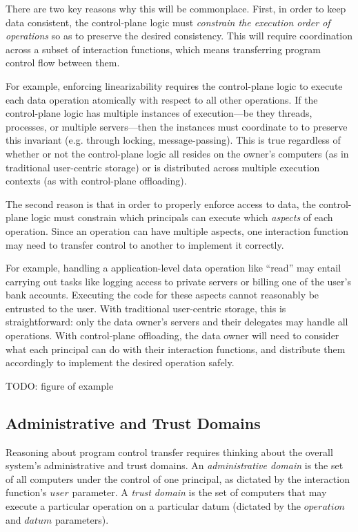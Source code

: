 There are two key reasons why this will be commonplace.  First, in order to keep data
consistent, the control-plane logic must \emph{constrain the execution order
of operations} so as to preserve the desired consistency.  This will require
coordination across a subset of interaction functions, which means
transferring program control flow between them.

For example, enforcing linearizability requires the control-plane logic to
execute each data operation atomically with respect to all other operations.
If the control-plane logic has multiple instances of execution---be
they threads, processes, or multiple servers---then the instances must coordinate to
to preserve this invariant (e.g. through locking, message-passing).  This is true regardless
of whether or not the control-plane logic all resides on the owner's computers
(as in traditional user-centric storage) or is distributed across multiple
execution contexts (as with control-plane offloading).

The second reason is that in order to properly enforce access to data, the control-plane logic
must constrain which principals can execute which \emph{aspects} of each
operation.  Since an operation can have multiple aspects, one interaction function
may need to transfer control to another to implement it correctly.

For example, handling a application-level data operation like ``read'' 
may entail carrying out tasks like logging access to private servers or billing one of
the user's bank accounts.  Executing the code for these aspects cannot reasonably be entrusted to the
user.  With traditional user-centric storage, this is
straightforward:  only the data owner's servers and their delegates may handle
all operations.  With control-plane offloading, the data owner will need to
consider what each principal can do with their interaction functions, and
distribute them accordingly to implement the desired operation safely.

TODO: figure of example

\subsection{Administrative and Trust Domains}

Reasoning about program control transfer
requires thinking about the overall system's
administrative and trust domains.  An \emph{administrative domain} is the set of
all computers under the control of one principal, as dictated by the interaction function's
$user$ parameter.  A \emph{trust domain} is
the set of computers that may execute a particular operation on a particular
datum (dictated by the $operation$ and $datum$ parameters).

